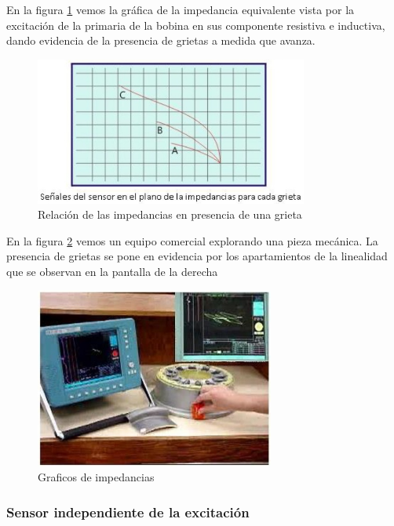 En la figura \ref{fig:58b} vemos la gráfica de la impedancia equivalente vista por la excitación de la primaria de la bobina en sus componente resistiva e inductiva, dando evidencia de la presencia de grietas a medida que avanza.

\begin{figure}[H]
    \centering
    \includegraphics[width=0.8\textwidth]{./Figures/fig58b}
	\caption{Relación de las impedancias en presencia de una grieta}
	\label{fig:58b}
\end{figure}

En la figura \ref{fig:59} vemos un equipo comercial explorando una pieza mecánica. La presencia de grietas se pone en evidencia por los apartamientos de la linealidad que se observan en la pantalla de la derecha

\begin{figure}[H]
    \centering
    \includegraphics[width=0.7\textwidth]{./Figures/fig59}
	\caption{Graficos de impedancias}
	\label{fig:59}
\end{figure}


\subsubsection{Sensor independiente de la excitación}


